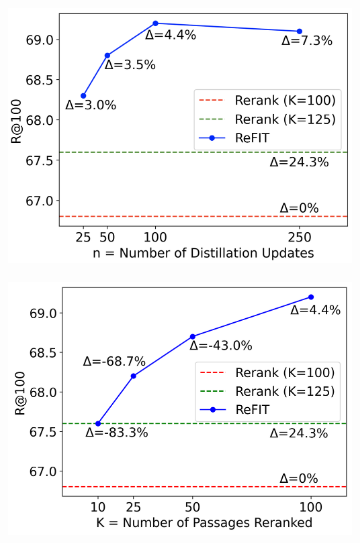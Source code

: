 \begin{figure}[t]
    \centering
    \begin{subfigure}[c]{0.32\linewidth}
        \centering
     \includegraphics[width=0.95\linewidth]{submissions/Revanth2024/figures/n_variation.png}
     \label{fig:qvec_1}
     \end{subfigure}
     \hfill
     \begin{subfigure}[c]{0.32\linewidth}
        \centering
     \includegraphics[width=0.95\linewidth]{submissions/Revanth2024/figures/K_variation_new.png}
     \label{fig:qvec_1}
     \end{subfigure}
     \hfill
     \begin{subfigure}[c]{0.32\linewidth}
        \centering

\end{subfigure}
\end{figure}
